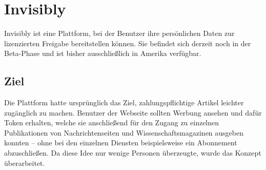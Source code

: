 \section{Invisibly} \label{invisibly}
Invisibly ist eine Plattform, bei der Benutzer ihre persönlichen Daten zur lizenzierten Freigabe bereitstellen können. Sie befindet sich derzeit noch in der Beta-Phase und ist bisher ausschließlich in Amerika verfügbar.

\subsection{Ziel}
Die Plattform hatte ursprünglich das Ziel, zahlungspflichtige Artikel leichter zugänglich zu machen. Benutzer der Webseite sollten Werbung ansehen und dafür Token erhalten, welche sie anschließend für den Zugang zu einzelnen Publikationen von Nachrichtenseiten und Wissenschaftsmagazinen ausgeben konnten -- ohne bei den einzelnen Diensten beispielsweise ein Abonnement abzuschließen. Da diese Idee nur wenige Personen überzeugte, wurde das Konzept überarbeitet. \cite{techRadarInvisibly_2021} \newline

